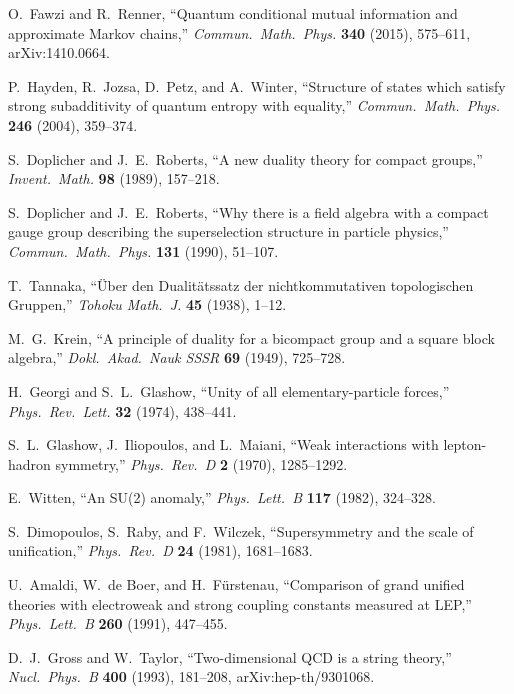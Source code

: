 O.~Fawzi and R.~Renner,
``Quantum conditional mutual information and approximate Markov chains,''
\emph{Commun.\ Math.\ Phys.} \textbf{340} (2015), 575--611,
arXiv:1410.0664.

P.~Hayden, R.~Jozsa, D.~Petz, and A.~Winter,
``Structure of states which satisfy strong subadditivity of quantum entropy with equality,''
\emph{Commun.\ Math.\ Phys.} \textbf{246} (2004), 359--374.

S.~Doplicher and J.~E.~Roberts,
``A new duality theory for compact groups,''
\emph{Invent.\ Math.} \textbf{98} (1989), 157--218.

S.~Doplicher and J.~E.~Roberts,
``Why there is a field algebra with a compact gauge group describing the superselection structure in particle physics,''
\emph{Commun.\ Math.\ Phys.} \textbf{131} (1990), 51--107.

T.~Tannaka,
``\"Uber den Dualit\"atssatz der nichtkommutativen topologischen Gruppen,''
\emph{Tohoku Math.\ J.} \textbf{45} (1938), 1--12.

M.~G.~Krein,
``A principle of duality for a bicompact group and a square block algebra,''
\emph{Dokl.\ Akad.\ Nauk SSSR} \textbf{69} (1949), 725--728.

H.~Georgi and S.~L.~Glashow,
``Unity of all elementary-particle forces,''
\emph{Phys.\ Rev.\ Lett.} \textbf{32} (1974), 438--441.

S.~L.~Glashow, J.~Iliopoulos, and L.~Maiani,
``Weak interactions with lepton-hadron symmetry,''
\emph{Phys.\ Rev.\ D} \textbf{2} (1970), 1285--1292.

E.~Witten,
``An SU(2) anomaly,''
\emph{Phys.\ Lett.\ B} \textbf{117} (1982), 324--328.

S.~Dimopoulos, S.~Raby, and F.~Wilczek,
``Supersymmetry and the scale of unification,''
\emph{Phys.\ Rev.\ D} \textbf{24} (1981), 1681--1683.

U.~Amaldi, W.~de Boer, and H.~F\"urstenau,
``Comparison of grand unified theories with electroweak and strong coupling constants measured at LEP,''
\emph{Phys.\ Lett.\ B} \textbf{260} (1991), 447--455.

D.~J.~Gross and W.~Taylor,
``Two-dimensional QCD is a string theory,''
\emph{Nucl.\ Phys.\ B} \textbf{400} (1993), 181--208,
arXiv:hep-th/9301068.

